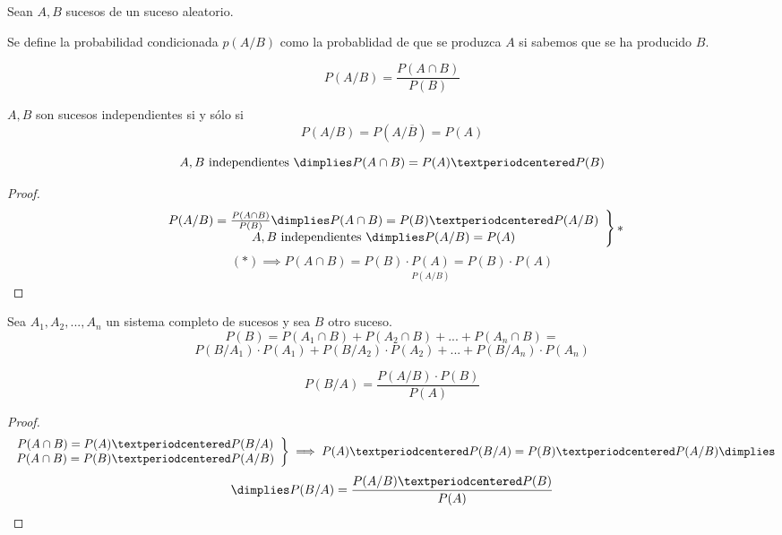 \begin{defn}
Sean $A,B$ sucesos de un suceso aleatorio. 

Se define la probabilidad condicionada $p(A/B)$ como la probablidad de que se produzca $A$ si sabemos que se ha producido $B$.

\[P(A/B) = \frac{P(A\cap B)}{P(B)}\]
\end{defn}

\begin{defn}
$A,B$ son sucesos independientes si y sólo si \[P(A/B) = P(A/\overline{B}) = P(A)\]
\end{defn}

\begin{theorem}
\[A,B \text{ independientes } \dimplies P(A\cap B) = P(A)·P(B)\]
\end{theorem}
\begin{proof}
\[\left.\begin{array}{c}
P(A/B) = \frac{P(A\cap B)}{P(B)} \dimplies P(A\cap B) = P(B)·P(A/B)\\A,B \text{ independientes } \dimplies P(A/B) = P(A)\end{array}\right\}*\]
\[(*) \implies P(A\cap B) = P(B)·\underset{P(A/B)}{P(A)} = P(B)·P(A)\]
\end{proof}

\begin{theorem}
Sea $A_1,A_2,...,A_n$ un sistema completo de sucesos y sea $B$ otro suceso.
\[  
    P(B) = P(A_1\cap B) + P(A_2\cap B) + ... + P(A_n\cap B) = 
\]
\[
    P(B/A_1)·P(A_1) + P(B/A_2) · P(A_2) + ... + P(B/A_n)·P(A_n)
\]
\end{theorem}
\begin{theorem}
\[P(B/A) = \frac{P(A/B)·P(B)}{P(A)}\]
\end{theorem}
\begin{proof}
\[
\left.
\begin{array}{c}
    P(A\cap B) = P(A)·P(B/A)\\
    P(A\cap B) = P(B)·P(A/B)
\end{array}\right\} \implies P(A)·P(B/A) =  P(B)·P(A/B) \dimplies \]\[\dimplies P(B/A) = \frac{P(A/B)·P(B)}{P(A)} 
\]
\end{proof}
